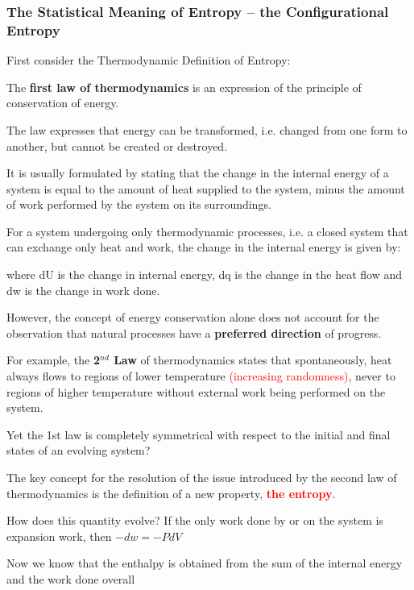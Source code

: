 \documentclass[a4paper,12pt,titlepage]{article}
\begin{document}
\begin{frame}[allowframebreaks=0.65]
\frametitle{The Statistical Meaning of Entropy -- the Configurational Entropy}
 
First consider the Thermodynamic Definition of Entropy:

The \textbf{first law of thermodynamics} is an expression of the principle of conservation of energy.

\medskip The law expresses that energy can be transformed, i.e. changed from one form to another, but cannot be created or destroyed.

\medskip It is usually formulated by stating that the change in the internal energy of a system is equal to the amount of heat supplied to the system, minus the amount of work performed by the system on its surroundings.


\medskip For a system undergoing only thermodynamic processes, i.e. a closed system that can exchange only heat and work, the change in the internal energy is given by:
\begin{center}  \end{center}

where dU is the change in internal energy, dq is the change in the heat flow and dw is the change in work done. 


\medskip However, the concept of energy conservation alone does not account for the observation that natural processes have a \textbf{preferred direction} of progress. 

 
\medskip For example, the \textbf{2\(^{nd}\) Law} of thermodynamics states that spontaneously, heat always flows to regions of lower temperature \textcolor{red}{(increasing randomness)}, never to regions of higher temperature without external work being performed on the system.  

 
\medskip Yet the 1st law is completely symmetrical with respect to the initial and final states of an evolving system?


\medskip The key concept for the resolution of the issue introduced by the second law of thermodynamics is the definition of a new property, \textcolor{red}{\textbf{the entropy}}.


\medskip How does this quantity evolve?
If the only work done by or on the system is expansion work, then  \(-dw = -PdV\)


\medskip Now we know that the enthalpy is obtained from the sum of the internal energy and the work done overall


\end{frame}
\end{document}
